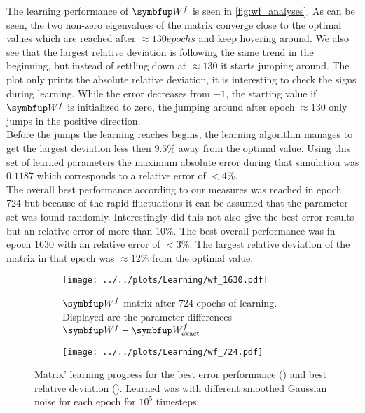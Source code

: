 The learning performance of $\bmu{W}^f$ is seen in \cref{fig:wf_analyses}. As can be seen, the two non-zero eigenvalues of the matrix converge close to the
optimal values which are reached after $\approx 130 epochs$ and keep hovering around.
We also see that the largest relative deviation is following the same trend in the beginning, but instead of settling down at $\approx 130$ it starts jumping around. The plot only prints the absolute relative deviation, it is interesting to check the signs during learning. While the error decreases from $-1$, the starting value if $\bmu{W}^f$ is initialized to zero, the jumping around after epoch $\approx 130$ only jumps in the positive direction.\\
Before the jumps the learning reaches begins, the learning algorithm manages to get the largest deviation less then $9.5\%$ away from the optimal value. Using this set of learned parameters the maximum absolute error during that simulation was $0.1187$ which corresponds to a relative error of $<4\%$.\\
The overall best performance according to our measures was reached in epoch 724 but because of the rapid fluctuations it can be assumed that the parameter set was found randomly. Interestingly did this not also give the best error results but an relative error of more than $10\%$. The best overall performance was in epoch 1630 with an relative error of $<3\%$. The largest relative deviation of the matrix  in that epoch was $\approx 12\%$ from the optimal value.\\
\begin{figure}
	\centering
	\begin{subfigure}[t]{0.48\textwidth}
		\texttt{[image: ../../plots/Learning/wf\_1630.pdf]}
		\caption{$\bmu{W}^f$ matrix after 724 epochs of learning. Displayed are the parameter differences $\bmu{W}^f - \bmu{W}^f_{\text{exact}}$ }  %
		\label{fig:subfig1}  %
	\end{subfigure}
	\hspace{0.02\textwidth}  %
	\begin{subfigure}[t]{0.48\textwidth}
		\texttt{[image: ../../plots/Learning/wf\_724.pdf]}
		\label{fig:subfig2}  %
	\end{subfigure}
\caption{Matrix' learning progress for the best error performance () and best relative deviation (). Learned was with different smoothed Gaussian noise for each epoch for $10^5$ timesteps.}
\label{fig:epoch_viz}
\end{figure}
